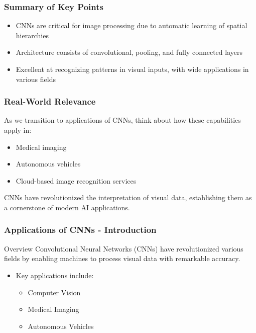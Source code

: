 \documentclass[aspectratio=169]{beamer}
\begin{document}
\begin{frame}[fragile]
    \frametitle{Summary of Key Points}
    \begin{itemize}
        \item CNNs are critical for image processing due to automatic learning of spatial hierarchies
        \item Architecture consists of convolutional, pooling, and fully connected layers
        \item Excellent at recognizing patterns in visual inputs, with wide applications in various fields
    \end{itemize}
\end{frame}

\begin{frame}[fragile]
    \frametitle{Real-World Relevance}
    As we transition to applications of CNNs, think about how these capabilities apply in:
    \begin{itemize}
        \item Medical imaging
        \item Autonomous vehicles
        \item Cloud-based image recognition services
    \end{itemize}
    CNNs have revolutionized the interpretation of visual data, establishing them as a cornerstone of modern AI applications.
\end{frame}

\begin{frame}[fragile]
    \frametitle{Applications of CNNs - Introduction}
    \begin{block}{Overview}
        Convolutional Neural Networks (CNNs) have revolutionized various fields by enabling machines to process visual data with remarkable accuracy. 
    \end{block}
    \begin{itemize}
        \item Key applications include:
            \begin{itemize}
                \item Computer Vision
                \item Medical Imaging
                \item Autonomous Vehicles
            \end{itemize}
    \end{itemize}
\end{frame}
\end{document}
